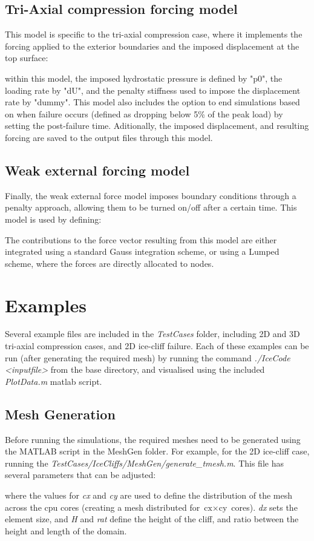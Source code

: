 \documentclass[3p]{elsarticle} %
\newcommand{\CodeSnipU}[4]{}
\begin{document}
\subsection{Tri-Axial compression forcing model}
This model is specific to the tri-axial compression case, where it implements the forcing applied to the exterior boundaries and the imposed displacement at the top surface:
\CodeSnipU{TestCases/TriAxialCompression/TriAxial.json}{223}{233}{TestCases/TriAxialCompression/TriAxial.json}
within this model, the imposed hydrostatic pressure is defined by "p0", the loading rate by "dU", and the penalty stiffness used to impose the displacement rate by "dummy". This model also includes the option to end simulations based on when failure occurs (defined as dropping below 5\% of the peak load) by setting the post-failure time. Aditionally, the imposed displacement, and resulting forcing are saved to the output files through this model.

\subsection{Weak external forcing model}
Finally, the weak external force model imposes boundary conditions through a penalty approach, allowing them to be turned on/off after a certain time. This model is used by defining:
\CodeSnipU{TestCases/IceCliffs/IceCliff.json}{247}{255}{TestCases/IceCliffs/IceCliff.json}
The contributions to the force vector resulting from this model are either integrated using a standard Gauss integration scheme, or using a Lumped scheme, where the forces are directly allocated to nodes. 

\section{Examples}
Several example files are included in the \textit{TestCases} folder, including 2D and 3D tri-axial compression cases, and 2D ice-cliff failure. Each of these examples can be run (after generating the required mesh) by running the command \textit{./IceCode <inputfile>} from the base directory, and visualised using the included \textit{PlotData.m} matlab script.

\subsection{Mesh Generation}
Before running the simulations, the required meshes need to be generated using the MATLAB script in the MeshGen folder. For example, for the 2D ice-cliff case, running the \textit{TestCases/IceCliffs/MeshGen/generate\_tmesh.m}. This file has several parameters that can be adjusted:
\CodeSnipU{TestCases/IceCliffs/MeshGen/generate_tmesh.m}{12}{16}{TestCases/IceCliffs/MeshGen/generate\_tmesh.m}
where the values for \textit{cx} and \textit{cy} are used to define the distribution of the mesh across the cpu cores (creating a mesh distributed for $\text{cx} \times \text{cy}$ cores). \textit{dx} sets the element size, and \textit{H} and \textit{rat} define the height of the cliff, and ratio between the height and length of the domain.  
\end{document}
